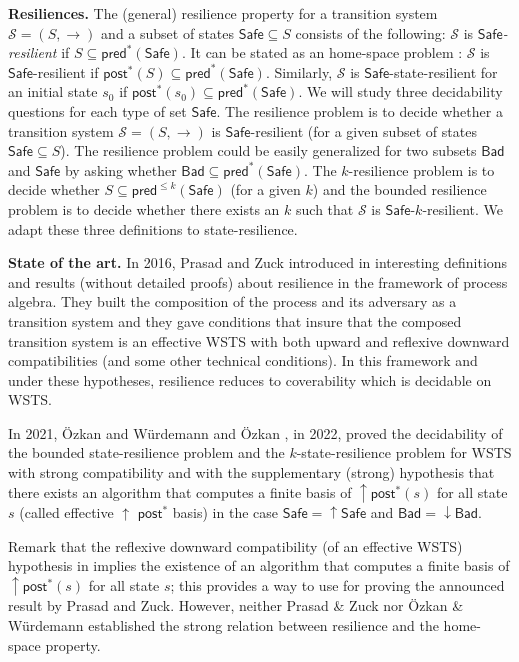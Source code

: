 \documentclass[runningheads]{llncs}
\newcommand{\pred}{\textsf{pred}}
\newcommand{\post}{\textsf{post}}
\newcommand{\Bad}{\textsf{Bad}}
\newcommand{\Safe}{\textsf{Safe}}
\begin{document}
{\bf Resiliences.}  
The (general) resilience property for a transition system $\mathscr{S} = (S,\rightarrow )$ and a subset of states $\Safe \subseteq S$ consists of the following: $\mathscr{S}$ is {\em $\Safe$-resilient} if
$S \subseteq \pred^*(\Safe)$. It 
can be stated as an home-space problem : $\mathscr{S}$ is $\Safe$-resilient if $\post^*(S) \subseteq \pred^*(\Safe)$.
Similarly, $\mathscr{S}$ is $\Safe$-state-resilient for an initial state $s_0$ if  
$\post^*(s_0) \subseteq \pred^*(\Safe)$.
We will study three decidability questions for each type of set $\Safe$.
The resilience problem is to decide whether a transition system $\mathscr{S} = (S,\rightarrow )$ is $\Safe$-resilient (for a given subset of states $\Safe \subseteq S$).
The resilience problem could be easily generalized for two subsets $\Bad$ and $\Safe$ by asking
whether $\Bad \subseteq \pred^*(\Safe)$.
The $k$-resilience problem is to decide whether $S \subseteq \pred^{\leq k}(\Safe)$ (for a given $k$) and 
the bounded resilience problem is to decide whether there exists an $k$ such that $\mathscr{S}$ is $\Safe$-$k$-resilient. We adapt these three definitions to state-resilience.


{\bf State of the art.}
In 2016, Prasad and Zuck introduced in  \cite{DBLP:journals/corr/PrasadZ16} interesting definitions and results (without detailed proofs) about resilience in the framework of process algebra. They built the composition of the process and its adversary as a transition system and they gave conditions that insure that the composed transition system is an effective WSTS with both upward and reflexive downward compatibilities (and some other technical conditions). In this framework and under these hypotheses, resilience reduces to coverability which is decidable on WSTS. 

In 2021, \"Ozkan and Würdemann  \cite{DBLP:journals/corr/abs-2108-00889} and \"Ozkan \cite{DBLP:conf/gg/Ozkan22}, in 2022, proved the decidability of the bounded state-resilience problem and the $k$-state-resilience problem for WSTS  with strong compatibility and with the supplementary (strong) hypothesis that there exists an algorithm that computes a finite basis of $\mathop{\uparrow} \post^*(s)$ for all state $s$ (called effective 
$\mathop{\uparrow}$ $\post^*$ basis) in the case $\Safe=\mathop{\uparrow} \Safe$ and $\Bad = \mathop{\downarrow} \Bad$.


Remark that the reflexive downward compatibility (of an effective WSTS) hypothesis in  \cite{DBLP:journals/corr/PrasadZ16} implies the existence of an algorithm that computes a finite basis of $\mathop{\uparrow} \post^*(s)$ for all state $s$; this provides a way to use \cite{DBLP:journals/corr/abs-2108-00889} for proving the announced result by Prasad and Zuck.
However, neither Prasad \& Zuck nor \"Ozkan \& Würdemann established the strong relation between resilience and the home-space property.
%
\end{document}
